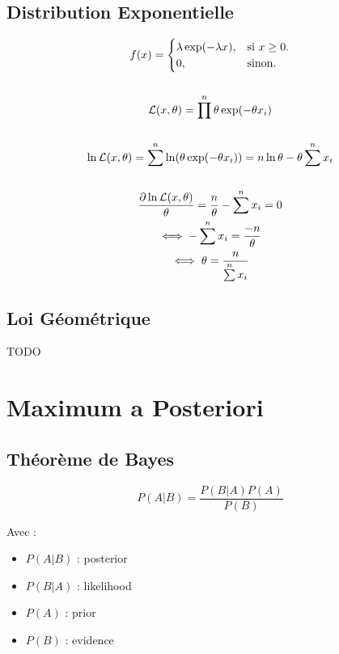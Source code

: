 \documentclass{article}
\begin{document}
\subsection{Distribution Exponentielle}

\begin{gather*}
    f(x) = \begin{cases}
        \lambda \exp(-\lambda x), & \text{si $x \geq 0$}.\\
        0, & \text{sinon}.
      \end{cases}
    \\ \\ 
    {\cal L}(x, \theta) = \prod\limits^n \theta \exp(-\theta x_i) \\ \\
    \ln {\cal L}(x, \theta) = \sum\limits^n \ln(\theta \exp(-\theta x_i)) = n\ln\theta - \theta \sum\limits^n x_i \\ \\
    \frac{\partial \ln {\cal L}(x, \theta)}{\theta} = \frac{n}{\theta} -\sum\limits^n x_i = 0 \\
    \iff -\sum\limits^n x_i = \frac{-n}{\theta} \\
    \iff \theta = \frac{n}{\sum\limits^n x_i}
\end{gather*}

\subsection{Loi Géométrique}

TODO



\section{Maximum a Posteriori}

\subsection{Théorème de Bayes}

\begin{equation}
    P(A|B) = \frac{P(B|A)P(A)}{P(B)}
\end{equation}

Avec : 
\begin{itemize}
    \item $P(A|B)$ : posterior
    \item $P(B|A)$ : likelihood
    \item $P(A)$ : prior
    \item $P(B)$ : evidence
\end{itemize}
\end{document}
